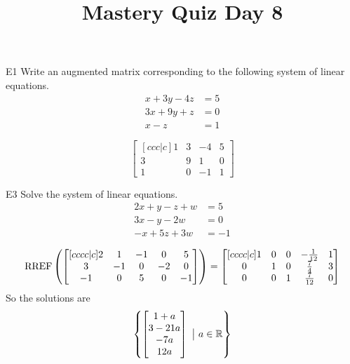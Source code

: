 \documentclass{sbgLAquiz}
\title{Mastery Quiz Day 8 }
\begin{document}
\begin{problem}{E1}
Write an augmented matrix corresponding to the following system of linear equations.
\begin{align*}
x+3y-4z &= 5 \\
3x+9y+z &= 0 \\
x-z &= 1
\end{align*}
\end{problem}
\begin{solution}
\[
\begin{bmatrix}[ccc|c]
1 & 3 & -4 & 5 \\
3 & 9 & 1 & 0 \\
1 & 0 & -1 & 1
\end{bmatrix}
\]
\end{solution}

\begin{problem}{E3}
Solve the system of linear equations.
\begin{align*}
2x+y-z+w &=5 \\
3x-y-2w &= 0 \\
-x+5z+3w&=-1
\end{align*}
\end{problem}
\begin{solution}
$$\operatorname{RREF}\left( \begin{bmatrix}[cccc|c] 2 & 1 & -1 & 0 & 5 \\ 3 & -1 & 0 & -2 & 0 \\ -1 & 0 & 5 & 0 & -1 \end{bmatrix} \right) = \begin{bmatrix}[cccc|c] 1 & 0 & 0 & -\frac{1}{12} & 1 \\ 0 & 1 & 0 & \frac{7}{4} & 3 \\ 0 & 0 & 1 & \frac{7}{12} & 0 \end{bmatrix}$$
So the solutions are $$\left\{ \begin{bmatrix} 1+a \\ 3-21a \\ -7a \\ 12a \end{bmatrix}\ \big|\ a \in \mathbb{R}\right\}$$
\end{solution}
\end{document}
